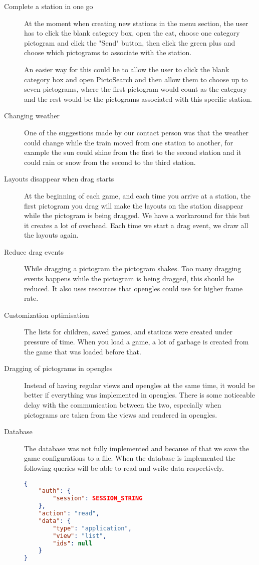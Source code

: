 \begin{description}
\item[Complete a station in one go] At the moment when creating new stations in the menu section, the user has to click the blank category box, open the \ac{cat}, choose one category pictogram and click the "Send" button, then click the green plus and choose which pictograms to associate with the station.

An easier way for this could be to allow the user to click the blank category box and open PictoSearch and then allow them to choose up to seven pictograms, where the first pictogram would count as the category and the rest would be the pictograms associated with this specific station.

\item[Changing weather] One of the suggestions made by our contact person was that the weather could change while the train moved from one station to another, for example the sun could shine from the first to the second station and it could rain or snow from the second to the third station. 

\item[Layouts disappear when drag starts] At the beginning of each game, and each time you arrive at a station, the first pictogram you drag will make the layouts on the station disappear while the pictogram is being dragged. We have a workaround for this but it creates a lot of overhead. Each time we start a drag event, we draw all the layouts again.

\item[Reduce drag events] While dragging a pictogram the pictogram shakes. Too many dragging events happens while the pictogram is being dragged, this should be reduced. It also uses resources that \ac{opengles} could use for higher frame rate.

\item[Customization optimisation] The lists for children, saved games, and stations were created under pressure of time. When you load a game, a lot of garbage is created from the game that was loaded before that.

\item[Dragging of pictograms in \ac{opengles}] Instead of having regular views and \ac{opengles} at the same time, it would be better if everything was implemented in \ac{opengles}. There is some noticeable delay with the communication between the two, especially when pictograms are taken from the views and rendered in \ac{opengles}.

\item[Database] The database was not fully implemented and because of that we save the game configurations to a file. When the database is implemented the following queries will be able to read and write data respectively.
\begin{lstlisting}[language=json,firstnumber=1,caption={JSON query to read application data.},label=lst:jsonread]
{
    "auth": {
        "session": SESSION_STRING
    },
    "action": "read",
    "data": {
        "type": "application",
        "view": "list",
        "ids": null
    }
}
\end{lstlisting}


\end{description}
